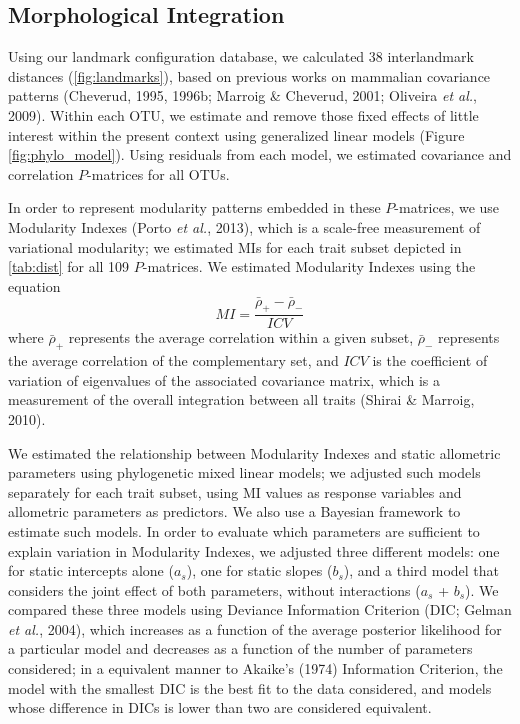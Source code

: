 \documentclass[12pt,]{article}
\begin{document}
\subsection{Morphological Integration}\label{morphological-integration}

Using our landmark configuration database, we calculated 38
interlandmark distances (\autoref{fig:landmarks}), based on previous
works on mammalian covariance patterns (Cheverud, 1995, 1996b; Marroig
\& Cheverud, 2001; Oliveira \emph{et al.}, 2009). Within each OTU, we
estimate and remove those fixed effects of little interest within the
present context using generalized linear models (Figure
\ref{fig:phylo_model}). Using residuals from each model, we estimated
covariance and correlation $P$-matrices for all OTUs.

In order to represent modularity patterns embedded in these
$P$-matrices, we use Modularity Indexes (Porto \emph{et al.}, 2013),
which is a scale-free measurement of variational modularity; we
estimated MIs for each trait subset depicted in \autoref{tab:dist} for
all 109 $P$-matrices. We estimated Modularity Indexes using the equation
\[
MI = \frac {\bar{\rho}_{+} - \bar{\rho}_{-}} {ICV}
\] where $\bar{\rho}_{+}$ represents the average correlation within a
given subset, $\bar{\rho}_{-}$ represents the average correlation of the
complementary set, and $ICV$ is the coefficient of variation of
eigenvalues of the associated covariance matrix, which is a measurement
of the overall integration between all traits (Shirai \& Marroig, 2010).

We estimated the relationship between Modularity Indexes and static
allometric parameters using phylogenetic mixed linear models; we
adjusted such models separately for each trait subset, using MI values
as response variables and allometric parameters as predictors. We also
use a Bayesian framework to estimate such models. In order to evaluate
which parameters are sufficient to explain variation in Modularity
Indexes, we adjusted three different models: one for static intercepts
alone ($a_s$), one for static slopes ($b_s$), and a third model that
considers the joint effect of both parameters, without interactions
($a_s$ + $b_s$). We compared these three models using Deviance
Information Criterion (DIC; Gelman \emph{et al.}, 2004), which increases
as a function of the average posterior likelihood for a particular model
and decreases as a function of the number of parameters considered; in a
equivalent manner to Akaike's (1974) Information Criterion, the model
with the smallest DIC is the best fit to the data considered, and models
whose difference in DICs is lower than two are considered equivalent.
\end{document}
